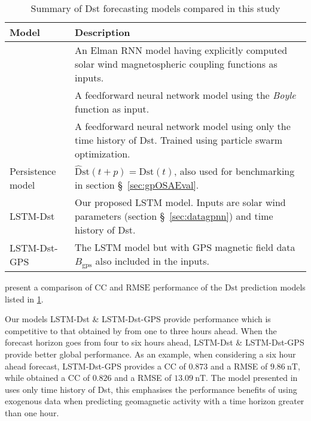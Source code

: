 \begin{table}[ht]
	\centering
	\caption{Summary of Dst forecasting models compared in this study}
	\label{table:competingmodels}
	\begin{tabular}{ l  p{} }
		\hline
		\textbf{Model} & \textbf{Description}\\
		\hline
		\citet{wu1997geomagnetic} & An Elman RNN model having explicitly computed solar wind magnetospheric 
		coupling functions as inputs.\\
		\citet{Bala2012} & A feedforward neural network model using the \emph{Boyle} function as input.\\
		\citet{Lazzus} & A feedforward neural network model using only the time history of Dst. Trained using 
		particle swarm optimization.\\
		Persistence model & $\mathrm{\hat{D}st}(t + p) = \mathrm{Dst}(t)$, also used for benchmarking in 
		section \S~\ref{sec:gpOSAEval}.\\
		LSTM-Dst & Our proposed LSTM model. Inputs are solar wind parameters (section \S~\ref{sec:datagpnn}) 
		and time history of Dst.\\
		LSTM-Dst-GPS & The LSTM model but with GPS magnetic field data $B_{\text{gps}}$ also included in the inputs. \\
		\hline
	\end{tabular}
\end{table}

 present a comparison of $\mathrm{CC}$ and $\mathrm{RMSE}$ performance of the 
$\mathrm{Dst}$ prediction models listed in \cref{table:competingmodels}. 

Our models LSTM-Dst \& LSTM-Dst-GPS provide performance which is competitive to that obtained by 
\citet{Lazzus} from one to three hours ahead. When the forecast horizon goes from four to six hours ahead, 
LSTM-Dst \& LSTM-Dst-GPS provide better global performance. As an example, when considering a six hour 
ahead forecast, LSTM-Dst-GPS provides a CC of $0.873$ and a RMSE of $\SI{9.86}{\nano\tesla}$, while \citet{Lazzus} 
obtained a CC of $0.826$ and a RMSE of $\SI{13.09}{\nano\tesla}$. The model presented in \citet{Lazzus} uses only 
time history of Dst, this emphasises the performance benefits of using exogenous data when predicting 
geomagnetic activity with a time horizon greater than one hour. 

